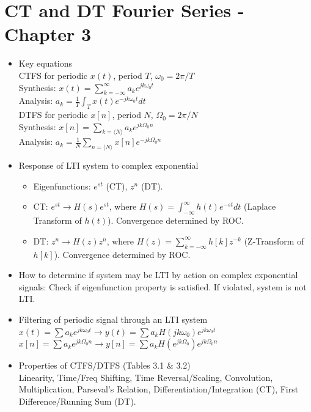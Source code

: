 \documentclass[10pt, twocolumn]{article}
\begin{document}
\section{CT and DT Fourier Series - Chapter 3}
\begin{itemize}
    \item Key equations \\
    CTFS for periodic $x(t)$, period $T$, $\omega_0 = 2\pi/T$ \\
    Synthesis: $x(t) = \sum_{k=-\infty}^{\infty} a_k e^{jk\omega_0 t}$ \\
    Analysis: $a_k = \frac{1}{T}\int_T x(t)e^{-jk\omega_0 t}dt$ \\
    DTFS for periodic $x[n]$, period $N$, $\Omega_0 = 2\pi/N$ \\
    Synthesis: $x[n] = \sum_{k=\langle N \rangle} a_k e^{jk\Omega_0 n}$ \\
    Analysis: $a_k = \frac{1}{N}\sum_{n=\langle N \rangle} x[n]e^{-jk\Omega_0 n}$
    \item Response of LTI system to complex exponential
        \begin{itemize}
            \item Eigenfunctions: $e^{st}$ (CT), $z^n$ (DT).
            \item CT: $e^{st} \to H(s)e^{st}$, where $H(s) = \int_{-\infty}^{\infty} h(t)e^{-st}dt$ (Laplace Transform of $h(t)$). Convergence determined by ROC.
            \item DT: $z^n \to H(z)z^n$, where $H(z) = \sum_{k=-\infty}^{\infty} h[k]z^{-k}$ (Z-Transform of $h[k]$). Convergence determined by ROC.
        \end{itemize}
    \item How to determine if system may be LTI by action on complex exponential signals: Check if eigenfunction property is satisfied. If violated, system is not LTI.
    \item Filtering of periodic signal through an LTI system \\
    $x(t) = \sum a_k e^{jk\omega_0 t} \to y(t) = \sum a_k H(jk\omega_0) e^{jk\omega_0 t}$ \\
    $x[n] = \sum a_k e^{jk\Omega_0 n} \to y[n] = \sum a_k H(e^{jk\Omega_0}) e^{jk\Omega_0 n}$
    \item Properties of CTFS/DTFS (Tables 3.1 \& 3.2) \\
    Linearity, Time/Freq Shifting, Time Reversal/Scaling, Convolution, Multiplication, Parseval's Relation, Differentiation/Integration (CT), First Difference/Running Sum (DT).

\end{itemize}
\end{document}
